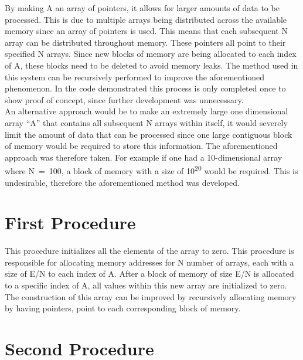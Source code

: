 \documentclass[conference]{IEEEtran}
\begin{document}
By making A an array of pointers, it allows for larger amounts of data to be processed. This is due to multiple arrays being distributed across the available memory since an array of pointers is used. This means that each subsequent N array can be distributed throughout memory. These pointers all point to their specified N arrays. Since new blocks of memory are being allocated to each index of A, these blocks need to be deleted to avoid memory leaks. The method used in this system can be recursively performed to improve the aforementioned phenomenon. In the code demonstrated this process is only completed once to show proof of concept, since further development was unnecessary.\\

An alternative approach would be to make an extremely large one dimensional array “A” that contains all subsequent N arrays within itself, it would severely limit the amount of data that can be processed since one large contiguous block of memory would be required to store this information. The aforementioned approach was therefore taken. For example if one had a 10-dimensional array where \mbox{N = 100}, a block of memory with a size of 10\textsuperscript{20} would be required. This is undesirable, therefore the aforementioned method was developed.\\


\section{First Procedure}

This procedure initializes all the elements of the array to zero. This procedure is responsible for allocating memory addresses for N number of arrays, each with a size of E/N to each index of A. After a block of memory of size E/N is allocated to a specific index of A, all values within this new array are initialized to zero. The construction of this array can be improved by recursively allocating memory by having pointers, point to each corresponding block of memory.\\


\section{Second Procedure}
\end{document}
